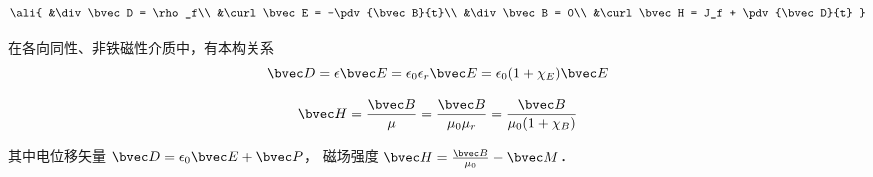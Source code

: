 
\begin{issues}
\issueDraft
\end{issues}


\begin{equation}\ali{
&\div\bvec D = \rho_f\\
&\curl\bvec E = -\pdv{\bvec B}{t}\\
&\div\bvec B = 0\\
&\curl\bvec H = J_f + \pdv{\bvec D}{t}
}\end{equation}


在各向同性、非铁磁性介质中，有本构关系
\begin{equation}
\bvec D = \epsilon \bvec E = \epsilon_0 \epsilon_r \bvec E = \epsilon_0(1 + \chi_E)\bvec E
\end{equation}

\begin{equation}
\bvec H = \frac{\bvec B}{\mu} = \frac{\bvec B}{\mu_0\mu_r} = \frac{\bvec B}{\mu_0(1 + \chi_B)}
\end{equation}


其中电位移矢量 $\bvec D = \epsilon_0 \bvec E + \bvec P$，  磁场强度 $\bvec H = \frac{\bvec B}{\mu_0} - \bvec M$．


